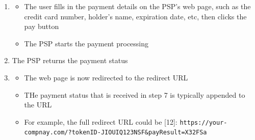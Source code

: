 \documentclass{report}
\theoremstyle{definition}
\begin{document}
\begin{enumerate}
\begin{itemize}
\begin{itemize}
\item

\begin{itemize}
\item
The token we received in step 4
\item
The PSP's javascript code uses the token to retrieve detailed information about the payment request from the PSP's backend
\item
One important piece of information is how much money to collect
\end{itemize}

\item

\begin{itemize}
\item
Another important piece of information is the redirect URL
\item
This is the web page URL that is called when the payment is complete
\item
When the PSP's JavScript finishes the payment, it redirects the browser to the redirect URL
\item
Usually, the redirect URL is an e-commerce web page that shows the status of the checkout
\item
Note that the redirect URL is different from the webhook [11] URL in step 9
\end{itemize}
\end{itemize}
\end{itemize}

\item

\begin{itemize}
\item
The user fills in the payment details on the PSP's web page, such as the credit card number, holder's name, expiration date, etc, then clicks the pay button
\item
The PSP starts the payment processing
\end{itemize}

\item
The PSP returns the payment status
\item

\begin{itemize}
\item
The web page is now redirected to the redirect URL
\item
THe payment status that is received in step 7 is typically appended to the URL
\item
For example, the full redirect URL could be [12]: \lstinline|https://your-compnay.com/?tokenID-JIOUIQ123NSF&payResult=X32FSa|
\end{itemize}


\end{enumerate}
\end{document}
